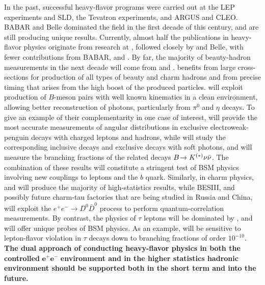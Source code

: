 \documentclass[12pt,a4paper]{article}
\begin{document}
In the past, successful heavy-flavor programs were carried out at the LEP experiments and SLD, the Tevatron experiments, and ARGUS and CLEO. BABAR and Belle dominated the field in the first decade of this century, and are still producing unique results. Currently, almost half the publications in  heavy-flavor physics originate from research at \lhcb, followed closely by \besiii and Belle, with fewer contributions from BABAR, \atlas and \cms. By far, the majority of beauty-hadron measurements in the next decade will come
from  \lhcb and \belletwo.
\lhcb benefits from large cross-sections for production of all types of beauty and charm hadrons and from precise timing that arises from the high boost of the produced particles. 
\belletwo will exploit production of $B$-meson pairs with well known kinematics in a clean environment, allowing better reconstruction of photons, particularly from $\pi^0$ and $\eta$ decays. To give an example of their complementarity in one case of interest, \lhcb will 
provide the most accurate measurements of angular distributions in exclusive electroweak-penguin decays with charged leptons and hadrons, while \belletwo will study
the corresponding inclusive decays and exclusive decays with soft photons, and will measure the branching fractions 
of the related decays $\mbox{\ensuremath{B\!\rightarrow K^{(\ast)}\nu\bar\nu}}$. The combination of 
these results will constitute a stringent test of BSM physics involving 
new couplings to leptons and the $b$ quark. 
Similarly, in charm physics, \lhcb and \belletwo will produce the majority of 
high-statistics results, while BESIII, and possibly future charm-tau
factories that are being studied in Russia and China,
will exploit the $e^+e^-\to D^0 \bar 
D^0$ process to perform quantum-correlation measurements. By contrast, the 
physics of $\tau$ leptons will be dominated by \belletwo, and will offer unique probes of BSM physics. As an example, \belletwo will be sensitive to lepton-flavor violation in $\tau$ decays down to branching fractions of order $10^{-10}$.
\textbf{The dual approach of conducting heavy-flavor physics in both 
the controlled} $\bm{e^+ e^-}$ \textbf{environment and in the higher
statistics hadronic environment should be supported both in the short term 
and into the future.}
\end{document}
